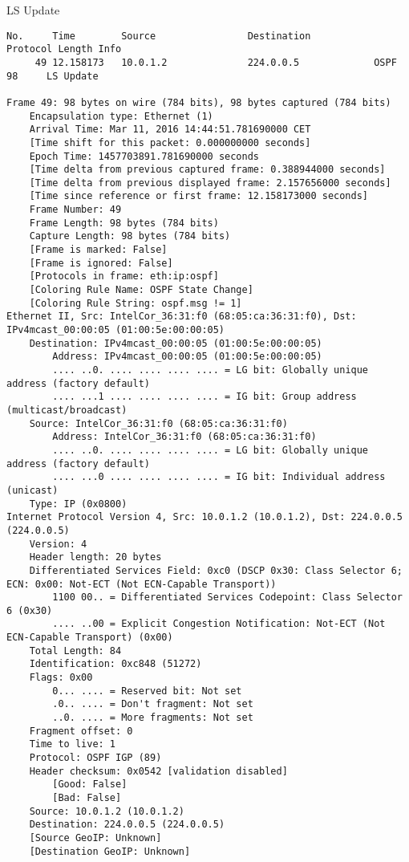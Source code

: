 LS Update
\begin{lstlisting}
No.     Time        Source                Destination           Protocol Length Info
     49 12.158173   10.0.1.2              224.0.0.5             OSPF     98     LS Update

Frame 49: 98 bytes on wire (784 bits), 98 bytes captured (784 bits)
    Encapsulation type: Ethernet (1)
    Arrival Time: Mar 11, 2016 14:44:51.781690000 CET
    [Time shift for this packet: 0.000000000 seconds]
    Epoch Time: 1457703891.781690000 seconds
    [Time delta from previous captured frame: 0.388944000 seconds]
    [Time delta from previous displayed frame: 2.157656000 seconds]
    [Time since reference or first frame: 12.158173000 seconds]
    Frame Number: 49
    Frame Length: 98 bytes (784 bits)
    Capture Length: 98 bytes (784 bits)
    [Frame is marked: False]
    [Frame is ignored: False]
    [Protocols in frame: eth:ip:ospf]
    [Coloring Rule Name: OSPF State Change]
    [Coloring Rule String: ospf.msg != 1]
Ethernet II, Src: IntelCor_36:31:f0 (68:05:ca:36:31:f0), Dst: IPv4mcast_00:00:05 (01:00:5e:00:00:05)
    Destination: IPv4mcast_00:00:05 (01:00:5e:00:00:05)
        Address: IPv4mcast_00:00:05 (01:00:5e:00:00:05)
        .... ..0. .... .... .... .... = LG bit: Globally unique address (factory default)
        .... ...1 .... .... .... .... = IG bit: Group address (multicast/broadcast)
    Source: IntelCor_36:31:f0 (68:05:ca:36:31:f0)
        Address: IntelCor_36:31:f0 (68:05:ca:36:31:f0)
        .... ..0. .... .... .... .... = LG bit: Globally unique address (factory default)
        .... ...0 .... .... .... .... = IG bit: Individual address (unicast)
    Type: IP (0x0800)
Internet Protocol Version 4, Src: 10.0.1.2 (10.0.1.2), Dst: 224.0.0.5 (224.0.0.5)
    Version: 4
    Header length: 20 bytes
    Differentiated Services Field: 0xc0 (DSCP 0x30: Class Selector 6; ECN: 0x00: Not-ECT (Not ECN-Capable Transport))
        1100 00.. = Differentiated Services Codepoint: Class Selector 6 (0x30)
        .... ..00 = Explicit Congestion Notification: Not-ECT (Not ECN-Capable Transport) (0x00)
    Total Length: 84
    Identification: 0xc848 (51272)
    Flags: 0x00
        0... .... = Reserved bit: Not set
        .0.. .... = Don't fragment: Not set
        ..0. .... = More fragments: Not set
    Fragment offset: 0
    Time to live: 1
    Protocol: OSPF IGP (89)
    Header checksum: 0x0542 [validation disabled]
        [Good: False]
        [Bad: False]
    Source: 10.0.1.2 (10.0.1.2)
    Destination: 224.0.0.5 (224.0.0.5)
    [Source GeoIP: Unknown]
    [Destination GeoIP: Unknown]

\end{lstlisting}
